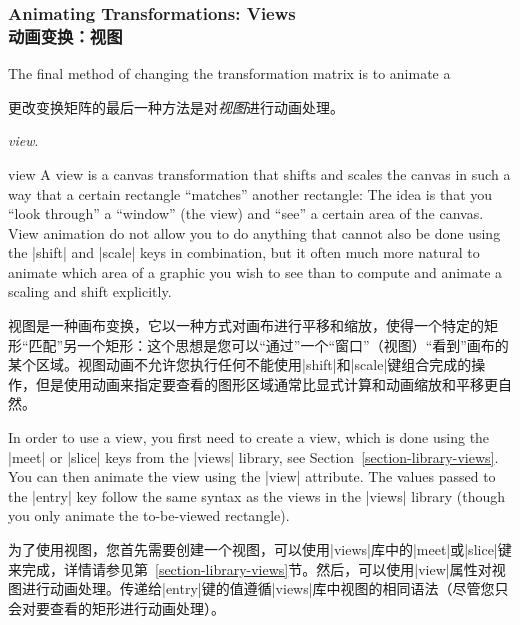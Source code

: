 \subsubsection{Animating Transformations: Views\\动画变换：视图}
\label{section-animation-views}

The final method of changing the transformation matrix is to animate a

更改变换矩阵的最后一种方法是对\emph{视图}进行动画处理。


\emph{view}.

\begin{tikzanimateattribute}{view}
    A view is a canvas transformation that shifts and scales the canvas in such
    a way that a certain rectangle ``matches'' another rectangle: The idea is
    that you ``look through'' a ``window'' (the view) and ``see'' a certain
    area of the canvas. View animation do not allow you to do anything that
    cannot also be done using the |shift| and |scale| keys in combination, but
    it often much more natural to animate which area of a graphic you wish to
    see than to compute and animate a scaling and shift explicitly.

    视图是一种画布变换，它以一种方式对画布进行平移和缩放，使得一个特定的矩形“匹配”另一个矩形：这个思想是您可以“通过”一个“窗口”（视图）“看到”画布的某个区域。视图动画不允许您执行任何不能使用|shift|和|scale|键组合完成的操作，但是使用动画来指定要查看的图形区域通常比显式计算和动画缩放和平移更自然。



    In order to use a view, you first need to create a view, which is done
    using the |meet| or |slice| keys from the |views| library, see
    Section~\ref{section-library-views}. You can then animate the view using
    the |view| attribute. The values passed to the |entry| key follow the same
    syntax as the views in the |views| library (though you only animate the
    to-be-viewed rectangle).

    为了使用视图，您首先需要创建一个视图，可以使用|views|库中的|meet|或|slice|键来完成，详情请参见第~\ref{section-library-views}节。然后，可以使用|view|属性对视图进行动画处理。传递给|entry|键的值遵循|views|库中视图的相同语法（尽管您只会对要查看的矩形进行动画处理）。

\begin{codeexample}[
    preamble={\usetikzlibrary{animations,views}},
    animation list={0.5,1,1.5,2},
    animation bb={(1.1,-0.9) rectangle (2.9,0.9)},
]
\end{codeexample}
\end{tikzanimateattribute}
